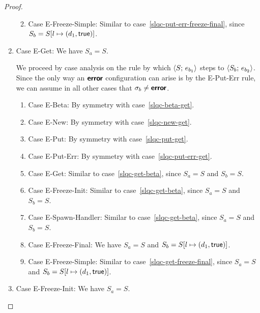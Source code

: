 \begin{proof}
\begin{enumerate}
\begin{enumerate}
      \TODO{}
    \item \label{slqc-put-err-freeze-simple}Case {\sc
      E-Freeze-Simple}: Similar to
      case~\ref{slqc-put-err-freeze-final}, since $S_b =
      S[l \mapsto (d_1, \textsf{true})]$.

    \end{enumerate}
  \item Case {\sc E-Get}: We have $S_a = S$.

    We proceed by case analysis on the rule by which
    $\langle S;\, e_{b_1} \rangle$ steps to $\langle S_b;\, e_{b_2} \rangle$.  Since the
    only way an $\textbf{\textsf{error}}$ configuration can arise is by the {\sc
      E-Put-Err} rule, we can assume in all other cases that $\sigma_b
    \neq \textbf{\textsf{error}}$.
    \begin{enumerate}
    \item \label{slqc-get-beta}Case {\sc E-Beta}: By symmetry with case~\ref{slqc-beta-get}.
    \item \label{slqc-get-new}Case {\sc E-New}: By symmetry with case~\ref{slqc-new-get}.
    \item \label{slqc-get-put}Case {\sc E-Put}: By symmetry with case~\ref{slqc-put-get}.
    \item \label{slqc-get-put-err}Case {\sc E-Put-Err}: By symmetry with case~\ref{slqc-put-err-get}.
    \item \label{slqc-get-get}Case {\sc E-Get}: Similar to
      case~\ref{slqc-get-beta}, since $S_a = S$ and $S_b = S$.
    \item \label{slqc-get-freeze-init}Case {\sc E-Freeze-Init}:
      Similar to case~\ref{slqc-get-beta}, since $S_a = S$ and $S_b = S$.
    \item \label{slqc-get-spawn-handler}Case {\sc E-Spawn-Handler}:
      Similar to case~\ref{slqc-get-beta}, since $S_a = S$ and $S_b = S$.
    \item \label{slqc-get-freeze-final}Case {\sc E-Freeze-Final}: We
      have $S_a = S$ and $S_b = S[l \mapsto (d_1, \textsf{true})]$.

      \TODO{}
    \item \label{slqc-get-freeze-simple}Case {\sc E-Freeze-Simple}:
      Similar to case~\ref{slqc-get-freeze-final}, since $S_a = S$ and $S_b =
      S[l \mapsto (d_1, \textsf{true})]$.
    \end{enumerate}

  \item Case {\sc E-Freeze-Init}: We have $S_a = S$.


\end{enumerate}
\end{proof}
